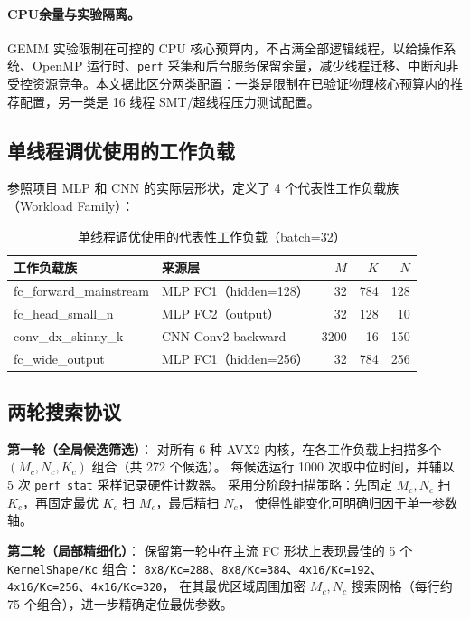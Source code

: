 \documentclass[a4paper,11pt,oneside]{article}
\begin{document}
\paragraph{CPU余量与实验隔离。}
GEMM 实验限制在可控的 CPU 核心预算内，不占满全部逻辑线程，以给操作系统、OpenMP 运行时、\texttt{perf} 采集和后台服务保留余量，减少线程迁移、中断和非受控资源竞争。本文据此区分两类配置：一类是限制在已验证物理核心预算内的推荐配置，另一类是 16 线程 SMT/超线程压力测试配置。

\subsection{单线程调优使用的工作负载}

参照项目 MLP 和 CNN 的实际层形状，定义了 4 个代表性工作负载族（Workload Family）：

\begin{table}[H]
\centering
\begin{tabular}{llrrr}
\toprule
\textbf{工作负载族} & \textbf{来源层} & $M$ & $K$ & $N$ \\
\midrule
fc\_forward\_mainstream & MLP FC1（hidden=128） & 32 & 784 & 128 \\
fc\_head\_small\_n      & MLP FC2（output）      & 32 & 128 & 10  \\
conv\_dx\_skinny\_k     & CNN Conv2 backward     & 3200 & 16 & 150 \\
fc\_wide\_output        & MLP FC1（hidden=256）  & 32 & 784 & 256 \\
\bottomrule
\end{tabular}
\caption{单线程调优使用的代表性工作负载（batch=32）}
\label{tab:tuning_workloads}
\end{table}

\subsection{两轮搜索协议}

\textbf{第一轮（全局候选筛选）}：
对所有 6 种 AVX2 内核，在各工作负载上扫描多个 $(M_c, N_c, K_c)$ 组合（共 272 个候选）。
每候选运行 1000 次取中位时间，并辅以 5 次 \texttt{perf stat} 采样记录硬件计数器。
采用分阶段扫描策略：先固定 $M_c, N_c$ 扫 $K_c$，再固定最优 $K_c$ 扫 $M_c$，最后精扫 $N_c$，
使得性能变化可明确归因于单一参数轴。

\textbf{第二轮（局部精细化）}：
保留第一轮中在主流 FC 形状上表现最佳的 5 个 \texttt{KernelShape/Kc} 组合：
\texttt{8x8/Kc=288}、\texttt{8x8/Kc=384}、\texttt{4x16/Kc=192}、
\texttt{4x16/Kc=256}、\texttt{4x16/Kc=320}，
在其最优区域周围加密 $M_c, N_c$ 搜索网格（每行约 75 个组合），进一步精确定位最优参数。
\end{document}
